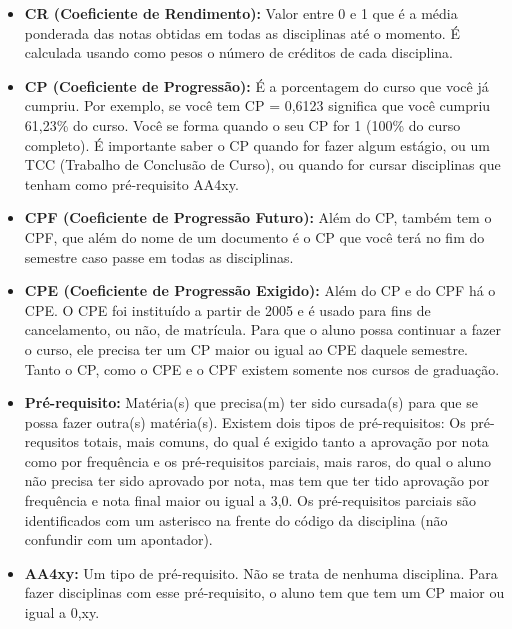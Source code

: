 \begin{itemize}
    \item  \textbf{CR (Coeficiente de Rendimento):} Valor entre 0 e 1 que é a
        média ponderada das notas obtidas em todas as disciplinas até o momento.
        É calculada usando como pesos o número de créditos de cada disciplina.

    \item  \textbf{CP (Coeficiente de Progressão):} É a porcentagem do curso que
        você já cumpriu. Por exemplo, se você tem CP = 0,6123 significa que você
        cumpriu 61,23\% do curso. Você se forma quando o seu CP for 1 (100\% do
        curso completo). É importante saber o CP quando for fazer algum estágio,
        ou um TCC (Trabalho de Conclusão de Curso), ou quando for cursar
        disciplinas que tenham como pré-requisito AA4xy.

    \item  \textbf{CPF (Coeficiente de Progressão Futuro):} Além do CP, também
        tem o CPF, que além do nome de um documento é o CP que você terá no fim
        do semestre caso passe em todas as disciplinas.

    \item  \textbf{CPE (Coeficiente de Progressão Exigido):} Além do CP e do CPF
        há o CPE. O CPE foi instituído a partir de 2005 e é usado para fins de
        cancelamento, ou não, de matrícula. Para que o aluno possa continuar a
        fazer o curso, ele precisa ter um CP maior ou igual ao CPE daquele
        semestre. Tanto o CP, como o CPE e o CPF existem somente nos cursos de
        graduação.

    \item  \textbf{Pré-requisito:} Matéria(s) que precisa(m) ter sido cursada(s)
        para que se possa fazer outra(s) matéria(s). Existem dois tipos de
        pré-requisitos: Os pré-requsitos totais, mais comuns, do qual é exigido
        tanto a aprovação por nota como por frequência e os pré-requisitos
        parciais, mais raros, do qual o aluno não precisa ter sido aprovado por
        nota, mas tem que ter tido aprovação por frequência e nota final maior
        ou igual a 3,0. Os pré-requisitos parciais são identificados com um
        asterisco na frente do código da disciplina (não confundir com um
        apontador).

    \item  \textbf{AA4xy:} Um tipo de pré-requisito. Não se trata de nenhuma
        disciplina. Para fazer disciplinas com esse pré-requisito, o aluno tem
        que tem um CP maior ou igual a 0,xy.


\end{itemize}
